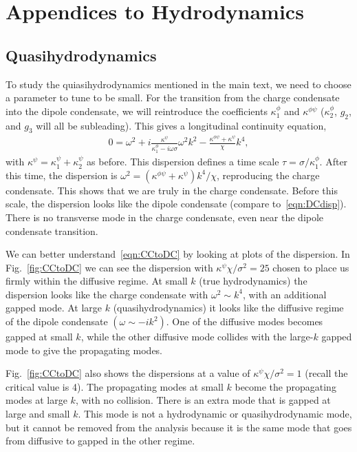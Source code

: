 
\chapter{Appendices to Hydrodynamics}

\section{Quasihydrodynamics}

To study the quiasihydrodynamics mentioned in the main text, we need to choose a parameter to tune to be small. For the transition from the charge condensate into the dipole condensate,  we will reintroduce the coefficients $\kappa^\phi_1$ and $\kappa^{\phi\psi}$ ($\kappa^\phi_2$, $g_2$, and $g_3$ will all be subleading). This gives a longitudinal continuity equation,
\begin{align}
0 = \omega^2 + i\frac{\kappa^{\psi}}{\kappa^\phi_1-i\omega \sigma}\omega^2 k^2 - \frac{\kappa^{\phi\psi}+\kappa^\psi}{\chi}k^4, \label{eqn:CCtoDC}
\end{align}
with $\kappa^{\psi}=\kappa^\psi_1+\kappa^\psi_2$ as before. This dispersion defines a time scale $\tau = \sigma/\kappa^\phi_1$. After this time, the dispersion is $\omega^2 = (\kappa^{\phi\psi}+\kappa^\psi) k^4 / \chi$, reproducing the charge condensate. This shows that we are truly in the charge condensate. Before this scale, the dispersion looks like the dipole condensate (compare to~\eqref{eqn:DCdisp}). There is no transverse mode in the charge condensate, even near the dipole condensate transition.

We can better understand~\eqref{eqn:CCtoDC} by looking at plots of the dispersion. In Fig.~\ref{fig:CCtoDC} we can see the dispersion with $\kappa^{\psi}\chi/\sigma^2=25$ chosen to place us firmly within the diffusive regime.  At small $k$ (true hydrodynamics) the dispersion looks like the charge condensate with $\omega^2 \sim k^4$, with an additional gapped mode.
At large $k$ (quasihydrodynamics) it looks like the diffusive regime of the dipole condensate $(\omega\sim -ik^2)$.  One of the diffusive modes becomes gapped at small $k$, while the other diffusive mode collides with the large-$k$ gapped mode to give the propagating modes. 

Fig.~\ref{fig:CCtoDC} also shows the dispersions at a value of $\kappa^{\psi}\chi/\sigma^2=1$ (recall the critical value is 4). The propagating modes at small $k$ become the propagating modes at large $k$, with no collision. There is an extra mode that is gapped at large and small $k$. This mode is not a hydrodynamic or quasihydrodynamic mode, but it cannot be removed from the analysis because it is the same mode that goes from diffusive to gapped in the other regime.



